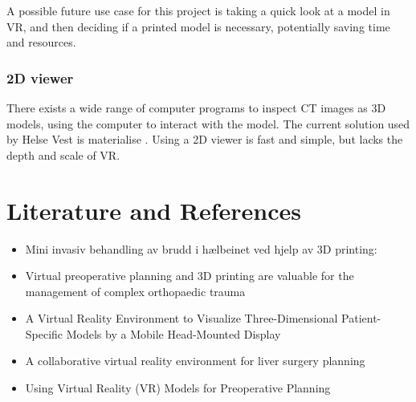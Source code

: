 \documentclass[12pt]{scrartcl}
\begin{document}
A possible future use case for this project is taking a quick look at a model in VR, and then deciding if a printed model is necessary, potentially saving time and resources.

\subsubsection{2D viewer}

There exists a wide range of computer programs to inspect CT images as 3D models, using the computer to interact with the model.
The current solution used by Helse Vest is materialise \cite{materialise}. Using a 2D viewer is fast and simple, but lacks the depth and scale of VR.


\section{Literature and References}

\begin{itemize}
\item Mini invasiv behandling av brudd i hælbeinet ved hjelp av 3D printing:


\item Virtual preoperative planning and 3D printing are valuable for the management of complex orthopaedic trauma


\item A Virtual Reality Environment to Visualize Three-Dimensional Patient-Specific Models by a Mobile Head-Mounted Display


\item A collaborative virtual reality environment for liver surgery planning

\item Using Virtual Reality (VR) Models for Preoperative Planning
\end{itemize}
\end{document}
